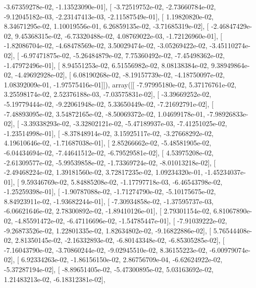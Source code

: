 \documentclass{article}
\begin{document}
         -3.67359278e-02,  -1.13523090e-01],
       [ -3.72519752e-02,  -2.73660784e-02,  -9.12045182e-03,
         -2.23147413e-03,  -2.11587549e-01],
       [  1.19820820e-02,   8.34671295e-02,   1.10019556e-01,
          6.26859135e-02,  -3.71685319e-02],
       [ -2.46847429e-02,   9.45368315e-02,  -6.73320488e-02,
          4.08769022e-03,  -1.72126960e-01],
       [ -1.82086704e-02,  -4.68478569e-02,   3.50029474e-02,
         -3.05269422e-02,  -3.45110274e-02],
       [ -6.97471875e-02,  -5.26484879e-02,   7.75360492e-02,
         -7.45498362e-02,  -1.47972496e-01],
       [  8.94551253e-02,   6.51556982e-02,   8.08138384e-02,
          9.38949864e-02,  -4.49692928e-02],
       [  6.08190268e-02,  -8.19157739e-02,  -4.18750097e-02,
          1.08392009e-01,  -1.97575416e-01]]), array([[ -7.97995180e-02,   5.37176761e-02,   3.25598174e-02,
          2.52376188e-03,  -7.03575831e-02],
       [ -3.39669252e-02,  -5.19779444e-02,  -9.22061948e-02,
          5.33650449e-02,  -7.21692791e-02],
       [ -7.48893095e-02,   3.54872165e-02,  -8.50069372e-02,
          1.04699178e-01,  -7.98926833e-02],
       [ -3.39338293e-02,  -3.32802121e-02,  -5.47189937e-03,
         -7.41251025e-02,  -1.23514998e-01],
       [ -8.37848914e-02,   3.15925117e-02,  -3.27668292e-02,
          4.19610646e-02,  -1.71687038e-01],
       [  2.85266662e-02,  -5.48581905e-02,  -6.04434694e-02,
         -7.44641512e-02,  -6.79529581e-02],
       [  4.53975208e-02,  -2.61309577e-02,  -5.99539858e-02,
         -1.73369724e-02,  -8.01013218e-02],
       [ -2.49468224e-02,   1.39181560e-02,   3.72817235e-02,
          1.09234320e-01,  -1.45234037e-01],
       [  9.59346769e-02,   5.84885208e-02,  -1.17797718e-03,
         -6.46543798e-02,  -1.25259398e-01],
       [ -1.90787088e-02,  -1.71274790e-02,  -5.10175675e-02,
          8.84923911e-02,  -1.93682244e-01],
       [ -7.30934858e-02,  -1.37595737e-03,  -6.06621646e-02,
          2.78300892e-02,  -1.89410126e-01],
       [  2.79301154e-02,   6.81067890e-02,  -4.85591472e-02,
         -6.47116696e-02,  -1.54785447e-01],
       [ -7.91039222e-02,  -9.26873526e-02,   1.22801335e-02,
          1.82634802e-02,  -9.16822886e-02],
       [  5.76544408e-02,   2.81350145e-02,  -2.16332893e-02,
         -6.80143348e-02,  -6.85305285e-02],
       [ -7.16043790e-02,  -3.70860244e-02,  -9.02945510e-02,
          8.36155223e-02,  -6.00979074e-02],
       [  6.92334263e-02,  -1.86156150e-02,   2.86756709e-04,
         -6.62624922e-02,  -5.37287194e-02],
       [ -8.89651405e-02,  -5.47300895e-02,   5.03163692e-02,
          1.21483213e-02,  -6.18312381e-02],
\end{document}
